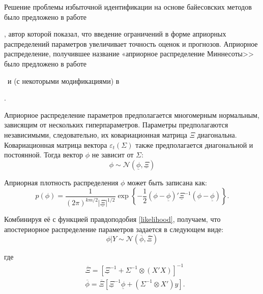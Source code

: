 \documentclass[11pt]{article} %
\newcommand{\cN}{\mathcal{N}}
\newcommand{\prior}{\underline}
\newcommand{\post}{\overline}
\newcommand{\eng}[1]{\begin{otherlanguage}{english}#1\end{otherlanguage}}
\begin{document}
Решение проблемы избыточной идентификации на основе байесовских методов было предложено в работе \eng{\cite{litterman_1979}}, автор которой показал, что введение ограничений в форме априорных распределений параметров увеличивает точность оценок и прогнозов. Априорное распределение, получившее название «априорное распределение Миннесоты>> было предложено в работе  \eng{\cite{litterman_1986}}~и (с некоторыми модификациями) в \eng{\cite{doan_al_1984}}.



Априорное распределение параметров предполагается многомерным нормальным, зависящим от нескольких гиперпараметров. Параметры предполагаются независимыми, следовательно, их ковариационная матрица $\Xi$ диагональна. Ковариационная матрица вектора $\varepsilon_t (\Sigma)$  также предполагается диагональной и постоянной.
Тогда вектор $\phi$ не зависит от $\Sigma$:
\begin{equation}
\phi\sim \cN(\prior \phi, \prior \Xi)
\end{equation}

Априорная плотность распределения $\phi$  может быть записана как:
\begin{equation}
p(\phi)=\frac{1}{(2\pi)^{km/2}|\prior\Xi|^{1/2}} \exp \left\lbrace-\frac{1}{2}(\phi-\prior \phi)'\prior\Xi^{-1}(\phi-\prior \phi ) \right\rbrace.
\end{equation}

Комбинируя её с функцией правдоподобия \eqref{likelihood}, получаем, что апостериорное распределение параметров задается в следующем виде:
\begin{equation}
\phi|Y\sim \cN(\post{\phi},\post \Xi)
\end{equation}

где
\begin{align*}
&\post \Xi=[\prior \Xi^{-1}+\Sigma^{-1}\otimes(X'X)]^{-1}\\
& \post \phi=\post{\Xi}[\prior \Xi^{-1}\prior \phi+(\Sigma^{-1}\otimes X')y].
\end{align*}
\end{document}
